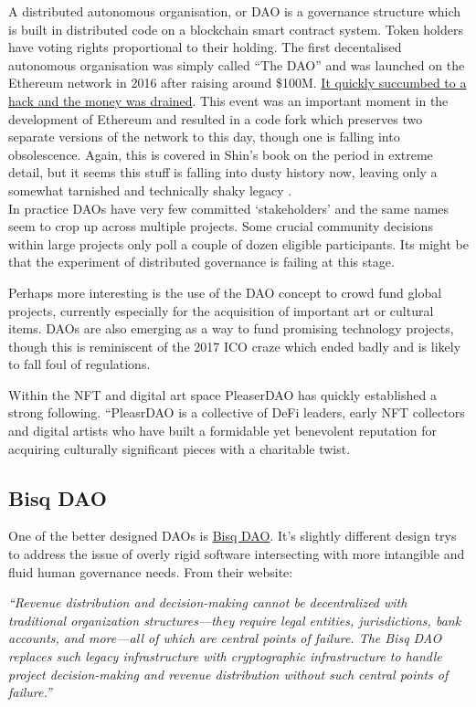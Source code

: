 A distributed autonomous organisation, or DAO is a governance structure which is built in distributed code on a blockchain smart contract system. Token holders have voting rights proportional to their holding. The first decentalised autonomous organisation was simply called ``The DAO'' and was launched on the Ethereum network in 2016 after raising around \$100M. \href{https://www.gemini.com/cryptopedia/the-dao-hack-makerdao#section-what-is-a-dao}{It quickly succumbed to a hack and the money was drained}. This event was an important moment in the development of Ethereum and resulted in a code fork which preserves two separate versions of the network to this day, though one is falling into obsolescence. Again, this is covered in Shin's book on the period in extreme detail, but it seems this stuff is falling into dusty history now, leaving only a somewhat tarnished and technically shaky legacy \cite{cryptopians}. \\
In practice DAOs have very few committed `stakeholders' and the same names seem to crop up across multiple projects. Some crucial community decisions within large projects only poll a couple of dozen eligible participants. Its might be that the experiment of distributed governance is failing at this stage. \par
Perhaps more interesting is the use of the DAO concept to crowd fund global projects, currently especially for the acquisition of important art or cultural items. DAOs are also emerging as a way to fund promising technology projects, though this is reminiscent of the 2017 ICO craze which ended badly and is likely to fall foul of regulations.\par
Within the NFT and digital art space  PleaserDAO has quickly established a strong following.
``PleasrDAO is a collective of DeFi leaders, early NFT collectors and digital artists who have built a formidable yet benevolent reputation for acquiring culturally significant pieces with a charitable twist.\par

\subsection{Bisq DAO}
One of the better designed DAOs is \href{https://bisq.network/dao/}{Bisq DAO}. It's slightly different design trys to address the issue of overly rigid software intersecting with more intangible and fluid human governance needs. From their website:\par
\textit{``Revenue distribution and decision-making cannot be decentralized with traditional organization structures—they require legal entities, jurisdictions, bank accounts, and more—all of which are central points of failure.
The Bisq DAO replaces such legacy infrastructure with cryptographic infrastructure to handle project decision-making and revenue distribution without such central points of failure.''}

